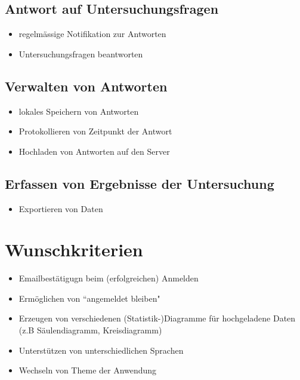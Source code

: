 \documentclass[a4paper]{scrreprt}
\begin{document}
            \subsection{Antwort auf Untersuchungsfragen}
                \begin{itemize}
                    \item regelm\"assige Notifikation zur Antworten
                    \item Untersuchungsfragen beantworten
                \end{itemize}
                
            \subsection{Verwalten von Antworten}
                \begin{itemize}
                    \item lokales Speichern von Antworten
                    \item Protokollieren von Zeitpunkt der Antwort
                    \item Hochladen von Antworten auf den Server
                \end{itemize}
            
            \subsection{Erfassen von Ergebnisse der Untersuchung}
                \begin{itemize}
                    \item Exportieren von Daten  
                \end{itemize}
 
        \section{Wunschkriterien}
            \begin{itemize}
                \item Emailbest\"atigugn beim (erfolgreichen) Anmelden
                \item Erm\"oglichen von ``angemeldet bleiben"
                \item Erzeugen von verschiedenen (Statistik-)Diagramme f\"ur hochgeladene Daten (z.B S\"aulendiagramm, Kreisdiagramm) 
                \item Unterst\"utzen von unterschiedlichen Sprachen
                \item Wechseln von Theme der Anwendung
            \end{itemize}
 
\end{document}
